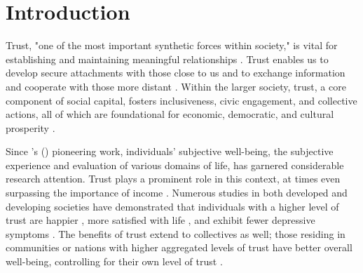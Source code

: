 \section{Introduction}
\label{sec:ch4-introduction}

Trust, "one of the most important synthetic forces within society," is vital for establishing and maintaining meaningful relationships \parencite[p.~326]{simmelSociologyGeorgSimmel1964}. Trust enables us to develop secure attachments with those close to us and to exchange information and cooperate with those more distant \parencite{rusbultCommitmentTrustClose1999,schilkeTrustSocialRelations2021,simpsonFoundationsInterpersonalTrust2007}. Within the larger society, trust, a core component of social capital, fosters inclusiveness, civic engagement, and collective actions, all of which are foundational for economic, democratic, and cultural prosperity \parencite{fukuyamaTrustSocialVirtues1996,fukuyamaSocialCapitalCivil2001,putnamBowlingAloneCollapse2001}.

Since \citeauthor{easterlinDoesEconomicGrowth1974}'s (\citeyear{easterlinDoesEconomicGrowth1974}) pioneering work, individuals' subjective well-being, the subjective experience and evaluation of various domains of life, has garnered considerable research attention. Trust plays a prominent role in this context, at times even surpassing the importance of income \parencite{bjornskovHappyFewCross2003,helliwellHowsLifeCombining2003}. Numerous studies in both developed and developing societies have demonstrated that individuals with a higher level of trust are happier \parencite{luLongitudinalEvidenceSocial2019,rodriguez-poseSocialCapitalIndividual2013}, more satisfied with life \parencite{zhangSocialTrustSatisfaction2020}, and exhibit fewer depressive symptoms \parencite{fahmiDoesYourNeighborhood2019,fujiwaraProspectiveStudyIndividuallevel2008}. The benefits of trust extend to collectives as well; those residing in communities or nations with higher aggregated levels of trust have better overall well-being, controlling for their own level of trust \parencite{helliwellHowsLifeCombining2003,tovWellBeingNationsLinking2009}.

